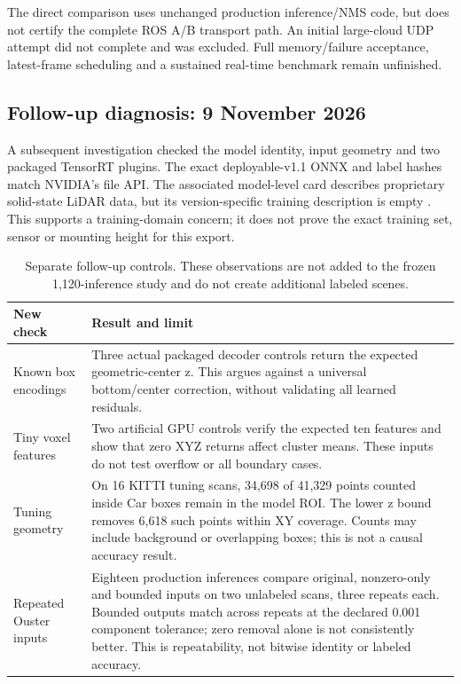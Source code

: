 \documentclass[11pt,a4paper]{article}
\begin{document}
The direct comparison uses unchanged production inference/NMS code, but does
not certify the complete ROS A/B transport path. An initial large-cloud UDP
attempt did not complete and was excluded. Full memory/failure acceptance,
latest-frame scheduling and a sustained real-time benchmark remain unfinished.

\subsection{Follow-up diagnosis: 9 November 2026}
A subsequent investigation checked the model identity, input geometry and two
packaged TensorRT plugins. The exact deployable-v1.1 ONNX and label hashes match
NVIDIA's file API. The associated model-level card describes proprietary
solid-state LiDAR data, but its version-specific training description is empty
\cite{ngcmodelcard}. This supports a training-domain concern; it does not prove
the exact training set, sensor or mounting height for this export.

\begin{table}[htbp]\centering\small
\begin{tabularx}{\linewidth}{@{}p{.25\linewidth}Y@{}}
\toprule
New check & Result and limit \\ \midrule
Known box encodings & Three actual packaged decoder controls return the expected geometric-center z. This argues against a universal bottom/center correction, without validating all learned residuals. \\
Tiny voxel features & Two artificial GPU controls verify the expected ten features and show that zero XYZ returns affect cluster means. These inputs do not test overflow or all boundary cases. \\
Tuning geometry & On 16 KITTI tuning scans, 34,698 of 41,329 points counted inside Car boxes remain in the model ROI. The lower z bound removes 6,618 such points within XY coverage. Counts may include background or overlapping boxes; this is not a causal accuracy result. \\
Repeated Ouster inputs & Eighteen production inferences compare original, nonzero-only and bounded inputs on two unlabeled scans, three repeats each. Bounded outputs match across repeats at the declared 0.001 component tolerance; zero removal alone is not consistently better. This is repeatability, not bitwise identity or labeled accuracy. \\
\bottomrule
\end{tabularx}
\caption{Separate follow-up controls. These observations are not added to the frozen 1,120-inference study and do not create additional labeled scenes.}
\label{tab:detection-followup}
\end{table}
\end{document}

